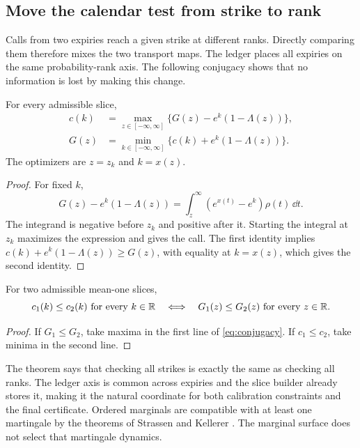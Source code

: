 \subsection{Move the calendar test from strike to rank}

Calls from two expiries reach a given strike at different ranks.  Directly
comparing them therefore mixes the two transport maps.  The ledger places all
expiries on the same probability-rank axis.  The following conjugacy shows
that no information is lost by making this change.

\begin{lemma}
\label{lem:conjugacy}
For every admissible slice,
\begin{equation}
\begin{aligned}
c(k)&=\max_{z\in[-\infty,\infty]}
\{G(z)-e^k(1-\Lambda(z))\},\\
G(z)&=\min_{k\in[-\infty,\infty]}
\{c(k)+e^k(1-\Lambda(z))\}.
\end{aligned}
\label{eq:conjugacy}
\end{equation}
The optimizers are $z=z_k$ and $k=x(z)$.
\end{lemma}

\begin{proof}
For fixed $k$,
\[
G(z)-e^k(1-\Lambda(z))
=\int_z^\infty(e^{x(t)}-e^k)\rho(t)\,\dd t.
\]
The integrand is negative before $z_k$ and positive after it.  Starting the
integral at $z_k$ maximizes the expression and gives the call.  The first
identity implies
$c(k)+e^k(1-\Lambda(z))\ge G(z)$, with equality at $k=x(z)$, which gives the
second identity.
\end{proof}

\begin{theorem}
\label{thm:ledgerorder}
For two admissible mean-one slices,
\begin{equation}
c_1(k)\le c_2(k)\ \text{for every }k\in\mathbb{R}
\quad\Longleftrightarrow\quad
G_1(z)\le G_2(z)\ \text{for every }z\in\mathbb{R}.
\label{eq:ledgerorder}
\end{equation}
\end{theorem}

\begin{proof}
If $G_1\le G_2$, take maxima in the first line of
\eqref{eq:conjugacy}.  If $c_1\le c_2$, take minima in the second line.
\end{proof}

The theorem says that checking all strikes is exactly the same as checking all
ranks.  The ledger axis is common across expiries and the slice builder already
stores it, making it the natural coordinate for both calibration constraints
and the final certificate.  Ordered marginals are compatible with at least
one martingale by the theorems of Strassen and Kellerer
\citep{Strassen1965,Kellerer1972}.  The marginal surface does not select that
martingale dynamics.

